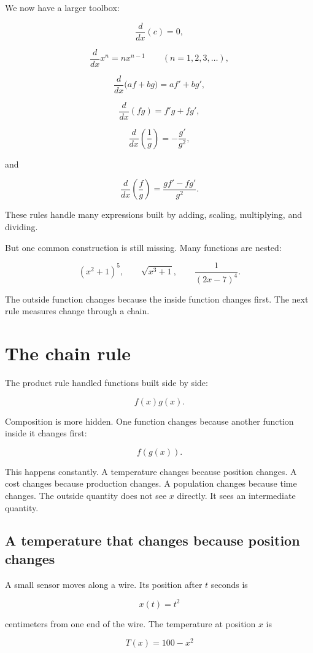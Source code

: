 We now have a larger toolbox:

\[
\frac{d}{dx}(c)=0,
\]

\[
\frac{d}{dx}x^n=nx^{n-1}
\qquad(n=1,2,3,\ldots),
\]

\[
\frac{d}{dx}\bigl(a f+b g\bigr)=a f'+b g',
\]

\[
\frac{d}{dx}(fg)=f'g+fg',
\]

\[
\frac{d}{dx}\left(\frac1g\right)=-\frac{g'}{g^2},
\]

and

\[
\frac{d}{dx}\left(\frac{f}{g}\right)=\frac{gf'-fg'}{g^2}.
\]

These rules handle many expressions built by adding, scaling, multiplying, and dividing.

But one common construction is still missing.  Many functions are nested:

\[
(x^2+1)^5,
\qquad
\sqrt{x^3+1},
\qquad
\frac1{(2x-7)^4}.
\]

The outside function changes because the inside function changes first.  The next rule measures change through a chain.
\section{The chain rule}
\label{sec:chain-rule}

The product rule handled functions built side by side:

\[
f(x)g(x).
\]

Composition is more hidden.  One function changes because another function inside it changes first:

\[
f(g(x)).
\]

This happens constantly.  A temperature changes because position changes.  A cost changes because production changes.  A population changes because time changes.  The outside quantity does not see \(x\) directly.  It sees an intermediate quantity.

\subsection{A temperature that changes because position changes}
\label{subsec:temperature-position-chain}

A small sensor moves along a wire.  Its position after \(t\) seconds is

\[
x(t)=t^2
\]

centimeters from one end of the wire.  The temperature at position \(x\) is

\[
T(x)=100-x^2
\]

